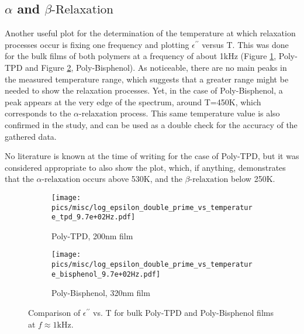 
\subsection{$\alpha$ and $\beta\text{-Relaxation}$}
Another useful plot for the determination of the temperature at which relaxation processes occur is fixing one frequency and plotting $\epsilon^{\prime\prime}$ versus T. This was done for the bulk films of both polymers at a frequency of about 1kHz (Figure \ref{epsvsttpd}, Poly-TPD and Figure \ref{epsvstbisph}, Poly-Bisphenol).
As noticeable, there are no main peaks in the measured temperature range, which suggests that a greater range might be needed to show the relaxation processes. Yet, in the case of Poly-Bisphenol, a peak appears at the very edge of the spectrum, around T=450K, which corresponds to the $\alpha\text{-relaxation}$ process. This same temperature value is also confirmed in the study, and can be used as a double check for the accuracy of the gathered data. %

No literature is known at the time of writing for the case of Poly-TPD, but it was considered appropriate to also show the plot, which, if anything, demonstrates that the $\alpha\text{-relaxation}$ occurs above 530K, and the $\beta\text{-relaxation}$ below 250K.

\begin{figure}[!htb]
\centering
\begin{subfigure}[t]{.5\textwidth}
  \centering
  \texttt{[image: pics/misc/log\_epsilon\_double\_prime\_vs\_temperature\_tpd\_9.7e+02Hz.pdf]}
  \caption{Poly-TPD, 200nm film}
  \label{epsvsttpd}
\end{subfigure}%
\begin{subfigure}[t]{.5\textwidth}
  \centering
  \texttt{[image: pics/misc/log\_epsilon\_double\_prime\_vs\_temperature\_bisphenol\_9.7e+02Hz.pdf]}
  \caption{Poly-Bisphenol, 320nm film}
  \label{epsvstbisph}
\end{subfigure}
\caption{Comparison of $\epsilon^{\prime\prime}$ vs. T for bulk Poly-TPD and Poly-Bisphenol films at $f \approx 1\text{kHz}$.}
\label{epsvstcomparison}
\end{figure}



